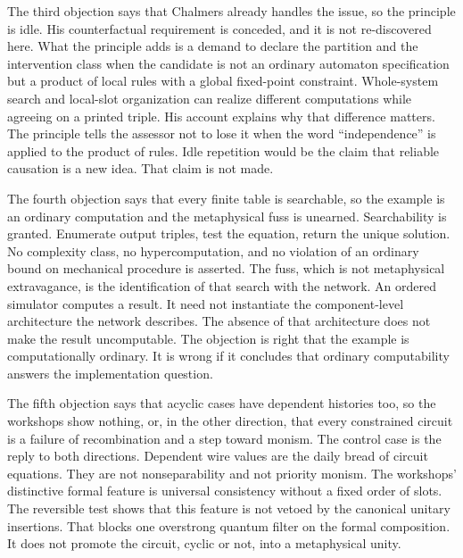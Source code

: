 \documentclass[12pt]{article}
\begin{document}
The third objection says that Chalmers already handles the issue, so the principle is idle. His counterfactual requirement is conceded, and it is not re-discovered here. What the principle adds is a demand to declare the partition and the intervention class when the candidate is not an ordinary automaton specification but a product of local rules with a global fixed-point constraint. Whole-system search and local-slot organization can realize different computations while agreeing on a printed triple. His account explains why that difference matters. The principle tells the assessor not to lose it when the word ``independence'' is applied to the product of rules. Idle repetition would be the claim that reliable causation is a new idea. That claim is not made.

The fourth objection says that every finite table is searchable, so the example is an ordinary computation and the metaphysical fuss is unearned. Searchability is granted. Enumerate output triples, test the equation, return the unique solution. No complexity class, no hypercomputation, and no violation of an ordinary bound on mechanical procedure is asserted. The fuss, which is not metaphysical extravagance, is the identification of that search with the network. An ordered simulator computes a result. It need not instantiate the component-level architecture the network describes. The absence of that architecture does not make the result uncomputable. The objection is right that the example is computationally ordinary. It is wrong if it concludes that ordinary computability answers the implementation question.

The fifth objection says that acyclic cases have dependent histories too, so the workshops show nothing, or, in the other direction, that every constrained circuit is a failure of recombination and a step toward monism. The control case is the reply to both directions. Dependent wire values are the daily bread of circuit equations. They are not nonseparability and not priority monism. The workshops' distinctive formal feature is universal consistency without a fixed order of slots. The reversible test shows that this feature is not vetoed by the canonical unitary insertions. That blocks one overstrong quantum filter on the formal composition. It does not promote the circuit, cyclic or not, into a metaphysical unity.
\end{document}
